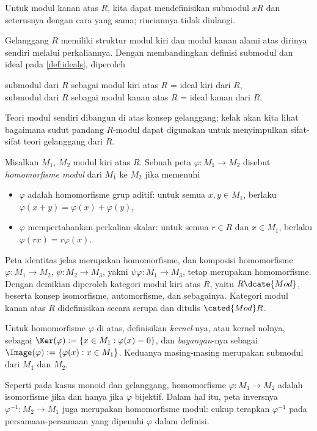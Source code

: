 Untuk modul kanan atas $R$, kita dapat mendefinisikan submodul $xR$ dan seterusnya dengan cara yang sama; rinciannya tidak diulangi.

\begin{example}
	Gelanggang $R$ memiliki struktur modul kiri dan modul kanan alami atas dirinya sendiri melalui perkaliannya. Dengan membandingkan definisi submodul dan ideal pada \ref{def:ideals}, diperoleh
	\begin{center}
		submodul dari $R$ sebagai modul kiri atas $R$ = ideal kiri dari $R$, \\
		submodul dari $R$ sebagai modul kanan atas $R$ = ideal kanan dari $R$.
	\end{center}
	Teori modul sendiri dibangun di atas konsep gelanggang; kelak akan kita lihat bagaimana sudut pandang $R$-modul dapat digunakan untuk menyimpulkan sifat-sifat teori gelanggang dari $R$.
\end{example}

\begin{definition}
	Misalkan $M_1$, $M_2$ modul kiri atas $R$. Sebuah peta $\varphi: M_1 \to M_2$ disebut \emph{homomorfisme modul} dari $M_1$ ke $M_2$ jika memenuhi
	\begin{itemize}
		\item $\varphi$ adalah homomorfisme grup aditif: untuk semua $x, y \in M_1$, berlaku $\varphi(x+y)=\varphi(x) + \varphi(y)$,
		\item $\varphi$ mempertahankan perkalian skalar: untuk semua $r \in R$ dan $x \in M_1$, berlaku $\varphi(rx) = r\varphi(x)$.
	\end{itemize}
	Peta identitas jelas merupakan homomorfisme, dan komposisi homomorfisme $\varphi: M_1 \to M_2$, $\psi: M_2 \to M_3$, yakni $\psi\varphi: M_1 \to M_3$, tetap merupakan homomorfisme. Dengan demikian diperoleh kategori modul kiri atas $R$, yaitu $R\dcate{Mod}$, beserta konsep isomorfisme, automorfisme, dan sebagainya. Kategori modul kanan atas $R$ didefinisikan secara serupa dan ditulis $\cated{Mod}R$.

	Untuk homomorfisme $\varphi$ di atas, definisikan \emph{kernel}-nya, atau kernel nolnya, sebagai $\Ker(\varphi) := \{x \in M_1 : \varphi(x)=0 \}$, dan \emph{bayangan}-nya sebagai $\Image(\varphi) := \{\varphi(x) : x \in M_1\}$. Keduanya masing-masing merupakan submodul dari $M_1$ dan $M_2$.
\end{definition}

Seperti pada kasus monoid dan gelanggang, homomorfisme $\varphi: M_1 \to M_2$ adalah isomorfisme jika dan hanya jika $\varphi$ bijektif. Dalam hal itu, peta inversnya $\varphi^{-1}: M_2 \to M_1$ juga merupakan homomorfisme modul: cukup terapkan $\varphi^{-1}$ pada persamaan-persamaan yang dipenuhi $\varphi$ dalam definisi.

